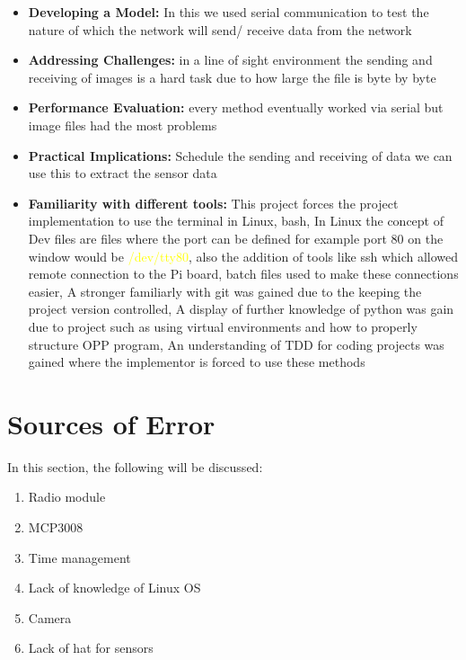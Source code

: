 \begin{itemize}
    \item \textbf{Developing a Model:} In this we used serial communication to test the nature of  which the network will send/ receive data from the network 
    \item \textbf{Addressing Challenges:} in a line of sight environment the sending and receiving of images is a hard task due to  how large the file is byte by byte
    \item \textbf{Performance Evaluation:} every method eventually worked via serial but image files had the  most problems
    \item \textbf{Practical Implications:} Schedule the sending  and  receiving  of data we can use this to extract the sensor data
    \item \textbf{Familiarity with different tools:} This project forces the project implementation to use the terminal in Linux, bash, In Linux the concept of Dev files are files where the port can be defined for example port 80 on the window would be \textcolor{yellow}{/dev/tty80}, also the addition of tools like ssh which allowed remote connection to the Pi board, batch files used to make these connections easier, A stronger familiarly with git was gained due to the keeping the project version controlled, A display of further knowledge of python was gain due to  project such as  using virtual environments and  how to properly structure OPP program, An understanding of  TDD for coding projects was gained where the implementor is forced to  use these methods
\end{itemize}
\section{Sources of Error}
In this section, the following will be discussed:
\begin{enumerate}
    \item Radio module
    \item MCP3008
    \item Time management
    \item Lack of knowledge of Linux OS
    \item Camera
    \item Lack of hat for sensors
\end{enumerate}
